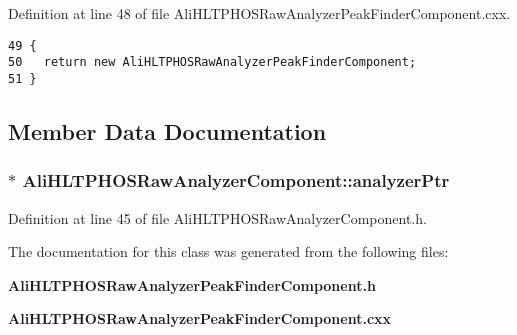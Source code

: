 Definition at line 48 of file Ali\-HLTPHOSRaw\-Analyzer\-Peak\-Finder\-Component.cxx.

\footnotesize\begin{verbatim}49 {
50   return new AliHLTPHOSRawAnalyzerPeakFinderComponent;
51 }
\end{verbatim}\normalsize 




\subsection{Member Data Documentation}
\subsubsection{$\ast$ {\bf Ali\-HLTPHOSRaw\-Analyzer\-Component::analyzer\-Ptr}\hspace{0.3cm}{\tt  [protected, inherited]}}\label{classAliHLTPHOSRawAnalyzerComponent_AliHLTPHOSRawAnalyzerPeakFinderComponentp0}




Definition at line 45 of file Ali\-HLTPHOSRaw\-Analyzer\-Component.h.

The documentation for this class was generated from the following files:\begin{CompactItemize}
\item 
{\bf Ali\-HLTPHOSRaw\-Analyzer\-Peak\-Finder\-Component.h}\item 
{\bf Ali\-HLTPHOSRaw\-Analyzer\-Peak\-Finder\-Component.cxx}\end{CompactItemize}
